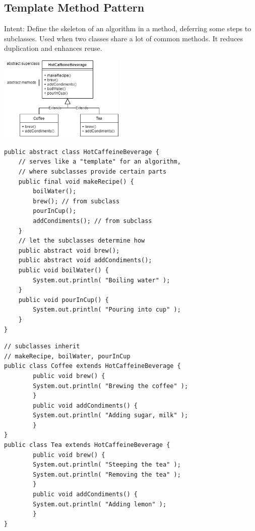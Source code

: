 \documentclass[8pt, letterpaper, titlepage]{article}
\begin{document}
\begin{multicols*}{2}
    \subsection*{Template Method Pattern}
    Intent: Define the skeleton of an algorithm in a method, deferring some steps to subclasses.
    Used when two classes share a lot of common methods. It reduces duplication and enhances reuse. \\
    \begin{center} 
        \includegraphics[width=6cm]{template.png}
    \end{center}

    \begin{lstlisting}
public abstract class HotCaffeineBeverage {
    // serves like a "template" for an algorithm,
    // where subclasses provide certain parts
    public final void makeRecipe() {
        boilWater();
        brew(); // from subclass
        pourInCup();
        addCondiments(); // from subclass
    }
    // let the subclasses determine how
    public abstract void brew();
    public abstract void addCondiments();
    public void boilWater() {
        System.out.println( "Boiling water" );
    }
    public void pourInCup() {
        System.out.println( "Pouring into cup" );
    }
}           
    \end{lstlisting}

    \begin{lstlisting}
// subclasses inherit
// makeRecipe, boilWater, pourInCup
public class Coffee extends HotCaffeineBeverage {
        public void brew() {
        System.out.println( "Brewing the coffee" );
        }
        public void addCondiments() {
        System.out.println( "Adding sugar, milk" );
        }
}
public class Tea extends HotCaffeineBeverage {
        public void brew() {
        System.out.println( "Steeping the tea" );
        System.out.println( "Removing the tea" );
        }
        public void addCondiments() {
        System.out.println( "Adding lemon" );
        }
}
                
    \end{lstlisting}

\end{multicols*}
\end{document}
